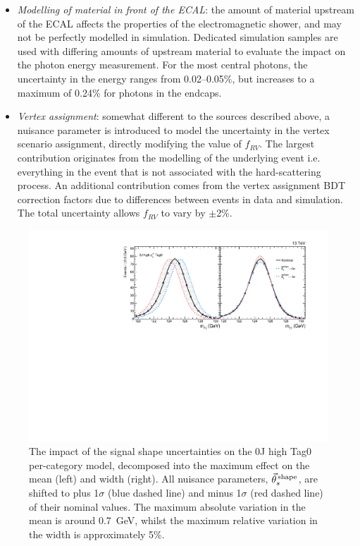\begin{itemize}
    \item \textit{Modelling of material in front of the ECAL}: the amount of material upstream of the ECAL affects the properties of the electromagnetic shower, and may not be perfectly modelled in simulation. Dedicated simulation samples are used with differing amounts of upstream material to evaluate the impact on the photon energy measurement. For the most central photons, the uncertainty in the energy ranges from 0.02--0.05\%, but increases to a maximum of 0.24\% for photons in the endcaps.
    
    \item \textit{Vertex assignment}: somewhat different to the sources described above, a nuisance parameter is introduced to model the uncertainty in the vertex scenario assignment, directly modifying the value of $f_{RV}$. The largest contribution originates from the modelling of the underlying event i.e. everything in the event that is not associated with the hard-scattering process. An additional contribution comes from the vertex assignment BDT correction factors due to differences between \Zmumu events in data and simulation. The total uncertainty allows $f_{RV}$ to vary by $\pm$2\%.
\end{itemize}

\begin{figure}[hptb]
  \centering
  \includegraphics[width=1\textwidth]{Figures/hgg_stats/shapeSyst_withVertex_dropHighR9.pdf}
  \caption[Signal shape systematic uncertainties]
  {
    The impact of the signal shape uncertainties on the 0J high \ptgg Tag0 per-category model, decomposed into the maximum effect on the mean (left) and width (right). All nuisance parameters, $\vec{\theta}^{\,\rm{shape}}_{s}$, are shifted to plus 1$\sigma$ (blue dashed line) and minus 1$\sigma$ (red dashed line) of their nominal values. The maximum absolute variation in the mean is around 0.7~GeV, whilst the maximum relative variation in the width is approximately 5\%.
  }
  \label{fig:systematics_sigshape}
\end{figure}



